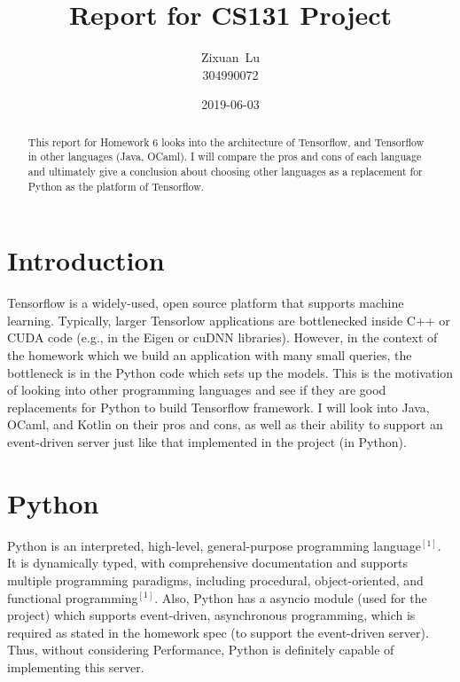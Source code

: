 \documentclass[letterpaper,twocolumn,10pt]{article}
\begin{document}

\date{2019-06-03}

\title{\Large \bf Report for CS131 Project}

\author{
{\rm Zixuan\ Lu}\\
304990072 
} %

\maketitle

\begin{abstract}
This report for Homework 6 looks into the architecture of Tensorflow, and Tensorflow in other languages (Java, OCaml). I will compare the pros and cons of each language and ultimately give a conclusion about choosing other languages as a replacement for Python as the platform of Tensorflow.
\end{abstract}


\section{Introduction}
Tensorflow is a widely-used, open source platform that supports machine learning. Typically, larger Tensorlow applications are bottlenecked inside C++ or CUDA code (e.g., in the Eigen or cuDNN libraries). However, in the context of the homework which we build an application with many small queries, the bottleneck is in the Python code which sets up the models. This is the motivation of looking into other programming languages and see if they are good replacements for Python to build Tensorflow framework. I will look into Java, OCaml, and Kotlin on their pros and cons, as well as their ability to support an event-driven server just like that implemented in the project (in Python).

\section{Python}
Python is an interpreted, high-level, general-purpose programming language$^{[1]}$. It is dynamically typed, with comprehensive documentation and supports multiple programming paradigms, including procedural, object-oriented, and functional programming$^{[1]}$. Also, Python has a asyncio module (used for the project) which supports event-driven, asynchronous programming, which is required as stated in the homework spec (to support the event-driven server). Thus, without considering Performance, Python is definitely capable of implementing this server.
\end{document}
